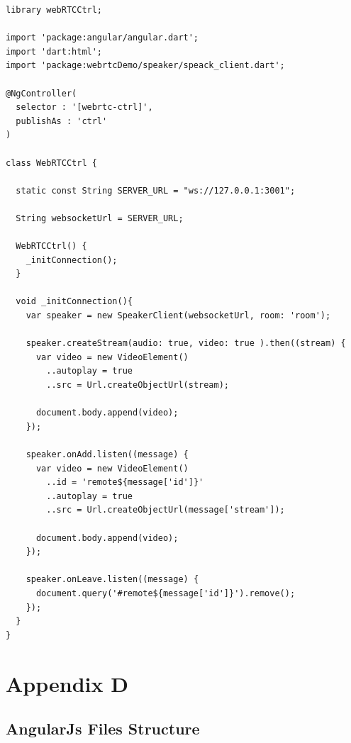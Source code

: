 \begin{appendices}
\begin{lstlisting}[caption={WebRTCCtrl in Dart application client},label={code:dart_webrtcctrl}]
library webRTCCtrl;

import 'package:angular/angular.dart';
import 'dart:html';
import 'package:webrtcDemo/speaker/speack_client.dart';

@NgController(
  selector : '[webrtc-ctrl]',
  publishAs : 'ctrl'
)

class WebRTCCtrl {

  static const String SERVER_URL = "ws://127.0.0.1:3001";

  String websocketUrl = SERVER_URL;

  WebRTCCtrl() {
    _initConnection();
  }

  void _initConnection(){
    var speaker = new SpeakerClient(websocketUrl, room: 'room');

    speaker.createStream(audio: true, video: true ).then((stream) {
      var video = new VideoElement()
        ..autoplay = true
        ..src = Url.createObjectUrl(stream);

      document.body.append(video);
    });

    speaker.onAdd.listen((message) {
      var video = new VideoElement()
        ..id = 'remote${message['id']}'
        ..autoplay = true
        ..src = Url.createObjectUrl(message['stream']);

      document.body.append(video);
    });

    speaker.onLeave.listen((message) {
      document.query('#remote${message['id']}').remove();
    });
  }
}
\end{lstlisting}

\chapter{Appendix D}

\section{AngularJs Files Structure}
\label{code:angularjs_structure}


\end{appendices}
